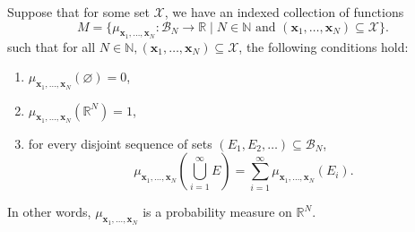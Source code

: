 \begin{theorem}\label{thm:kol-ext}
    Suppose that for some set $\mathcal{X}$, we have an indexed collection of functions
    \begin{equation*}
        M = \{ \mu_{\mathbf{x}_1, \dots, \mathbf{x}_N} : \mathcal{B}_{N} \to \mathbb{R} \;|\; N \in \mathbb{N} \text{ and } (\mathbf{x}_1, \dots, \mathbf{x}_N) \subseteq \mathcal{X}\}.
    \end{equation*}
    such that for all $N \in \mathbb{N}, (\mathbf{x}_1, \dots, \mathbf{x}_N) \subseteq \mathcal{X}$,
    the following conditions hold:
    \begin{enumerate}
        \item $\mu_{\mathbf{x}_1, \dots, \mathbf{x}_N}( \varnothing) = 0$,

        \item $\mu_{\mathbf{x}_1, \dots, \mathbf{x}_N}(\mathbb{R}^{N}) = 1$,
        \item for every disjoint sequence of sets $(E_1, E_2, \dots) \subseteq \mathcal{B}_N$,
            \begin{equation*}
                \mu_{\mathbf{x}_1, \dots, \mathbf{x}_N}\left(\bigcup_{i = 1}^{\infty} E\right)
                =
                \sum_{i = 1}^{\infty}\mu_{\mathbf{x}_1, \dots, \mathbf{x}_N}(E_i).
            \end{equation*}
    \end{enumerate}
    In other words, $\mu_{\mathbf{x}_1, \dots, \mathbf{x}_N}$ is a probability measure on $\mathbb{R}^{N}$.
    

\end{theorem}
